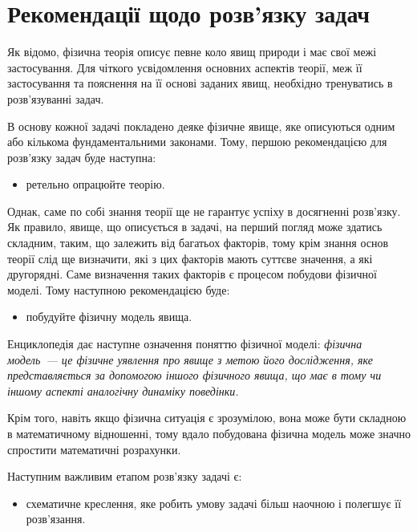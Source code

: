 
\introtrue
\chapter*{Рекомендації щодо розв'язку задач}

Як відомо, фізична теорія описує певне коло явищ природи і має свої межі застосування. Для чіткого усвідомлення основних аспектів теорії, меж її застосування та пояснення на її основі заданих явищ, необхідно тренуватись в  розв'язуванні задач. 

В основу кожної задачі покладено деяке фізичне явище, яке описуються одним або кількома фундаментальними законами. Тому, першою рекомендацією для розв'язку задач буде наступна:
\begin{itemize}
\item ретельно опрацюйте теорію.
\end{itemize}

Однак, саме по собі знання теорії ще не гарантує успіху в досягненні розв'язку. Як правило, явище, що описується в задачі, на перший погляд може здатись складним, таким, що залежить від багатьох факторів, тому крім знання основ теорії слід ще визначити, які з цих факторів мають суттєве значення, а які другорядні. Саме визначення таких факторів є процесом побудови фізичної моделі. Тому наступною рекомендацією буде:
\begin{itemize}
\item побудуйте фізичну модель явища.
\end{itemize}

Енциклопедія дає наступне означення поняттю фізичної моделі: \emph{фізична модель~--- це фізичне уявлення про явище з метою його дослідження, яке представляється за допомогою іншого фізичного явища, що має в тому чи іншому аспекті аналогічну динаміку поведінки.}

Крім того, навіть якщо фізична ситуація є зрозумілою, вона може бути складною в математичному відношенні, тому вдало побудована фізична модель може значно спростити математичні розрахунки.

Наступним важливим етапом розв'язку задачі є: 
\begin{itemize}
\item схематичне креслення, яке робить умову задачі більш наочною і полегшує її розв’язання. 
\end{itemize}


